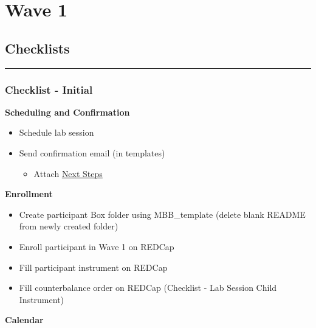 \documentclass[]{book}
\providecommand{\tightlist}{%
  \setlength{\itemsep}{0pt}\setlength{\parskip}{0pt}}
\begin{document}
\hypertarget{wave-1}{%
\chapter{Wave 1}\label{wave-1}}

\hypertarget{checklists}{%
\section{Checklists}\label{checklists}}

\begin{center}\rule{0.5\linewidth}{0.5pt}\end{center}

\hypertarget{checklist---initial}{%
\subsection{Checklist - Initial}\label{checklist---initial}}

\textbf{Scheduling and Confirmation}

\begin{itemize}
\tightlist
\item
  Schedule lab session
\item
  Send confirmation email (in templates)

  \begin{itemize}
  \tightlist
  \item
    Attach \href{https://app.box.com/file/630326369239}{Next Steps}
  \end{itemize}
\end{itemize}

\textbf{Enrollment}

\begin{itemize}
\tightlist
\item
  Create participant Box folder using MBB\_template (delete blank README from newly created folder)
\item
  Enroll participant in Wave 1 on REDCap
\item
  Fill participant instrument on REDCap
\item
  Fill counterbalance order on REDCap (Checklist - Lab Session Child Instrument)
\end{itemize}

\textbf{Calendar}
\end{document}
